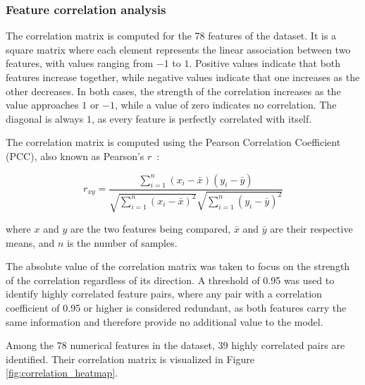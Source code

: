 \subsubsection{Feature correlation analysis}

The correlation matrix is computed for the 78 features of the dataset. It is a square matrix where each element represents the linear association between two features, with values ranging from $-1$ to $1$. Positive values indicate that both features increase together, while negative values indicate that one increases as the other decreases. In both cases, the strength of the correlation increases as the value approaches $1$ or $-1$, while a value of zero indicates no correlation. The diagonal is always $1$, as every feature is perfectly correlated with itself.

The correlation matrix is computed using the Pearson Correlation Coefficient (PCC), also known as Pearson's $r$~\cite{Pear}:

\begin{equation*}
    r_{xy} = \frac{\sum_{i=1}^{n} (x_i - \bar{x})(y_i - \bar{y})}{\sqrt{\sum_{i=1}^{n}
            (x_i - \bar{x})^2} \sqrt{\sum_{i=1}^{n} (y_i - \bar{y})^2}}
\end{equation*}

where $x$ and $y$ are the two features being compared, $\bar{x}$ and $\bar{y}$ are their respective means, and $n$ is the number of samples.

The absolute value of the correlation matrix was taken to focus on the strength of the correlation regardless of its direction. A threshold of 0.95 was used to identify highly correlated feature pairs, where any pair with a correlation coefficient of 0.95 or higher is considered redundant, as both features carry the same information and therefore provide no additional value to the model.

Among the 78 numerical features in the dataset, 39 highly correlated pairs are identified. Their correlation matrix is visualized in Figure \ref{fig:correlation_heatmap}.


